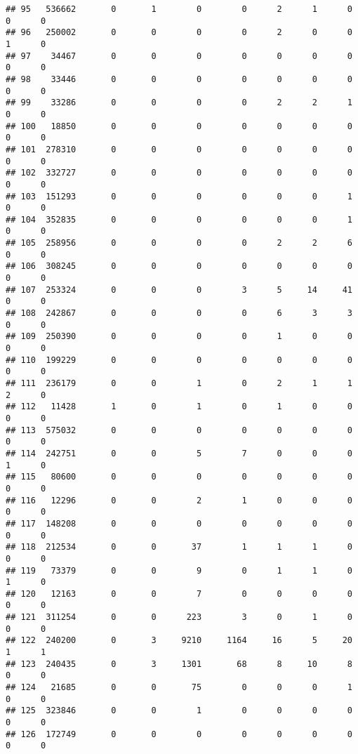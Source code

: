 \documentclass[
]{article}
\begin{document}
\begin{verbatim}
## 95   536662       0       1        0        0      2      1      0     0      0
## 96   250002       0       0        0        0      2      0      0     1      0
## 97    34467       0       0        0        0      0      0      0     0      0
## 98    33446       0       0        0        0      0      0      0     0      0
## 99    33286       0       0        0        0      2      2      1     0      0
## 100   18850       0       0        0        0      0      0      0     0      0
## 101  278310       0       0        0        0      0      0      0     0      0
## 102  332727       0       0        0        0      0      0      0     0      0
## 103  151293       0       0        0        0      0      0      1     0      0
## 104  352835       0       0        0        0      0      0      1     0      0
## 105  258956       0       0        0        0      2      2      6     0      0
## 106  308245       0       0        0        0      0      0      0     0      0
## 107  253324       0       0        0        3      5     14     41     0      0
## 108  242867       0       0        0        0      6      3      3     0      0
## 109  250390       0       0        0        0      1      0      0     0      0
## 110  199229       0       0        0        0      0      0      0     0      0
## 111  236179       0       0        1        0      2      1      1     2      0
## 112   11428       1       0        1        0      1      0      0     0      0
## 113  575032       0       0        0        0      0      0      0     0      0
## 114  242751       0       0        5        7      0      0      0     1      0
## 115   80600       0       0        0        0      0      0      0     0      0
## 116   12296       0       0        2        1      0      0      0     0      0
## 117  148208       0       0        0        0      0      0      0     0      0
## 118  212534       0       0       37        1      1      1      0     0      0
## 119   73379       0       0        9        0      1      1      0     1      0
## 120   12163       0       0        7        0      0      0      0     0      0
## 121  311254       0       0      223        3      0      1      0     0      0
## 122  240200       0       3     9210     1164     16      5     20     1      1
## 123  240435       0       3     1301       68      8     10      8     0      0
## 124   21685       0       0       75        0      0      0      1     0      0
## 125  323846       0       0        1        0      0      0      0     0      0
## 126  172749       0       0        0        0      0      0      0     0      0

\end{verbatim}
\end{document}
